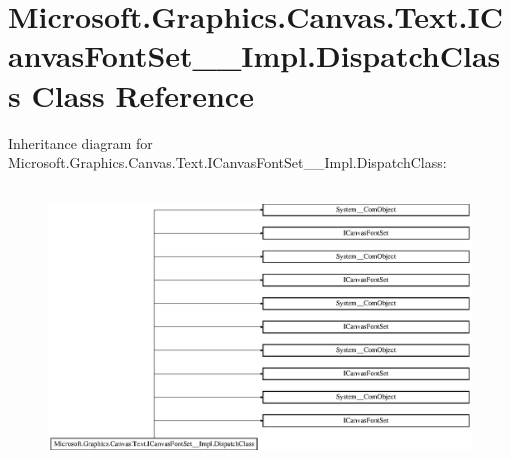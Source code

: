 \hypertarget{class_microsoft_1_1_graphics_1_1_canvas_1_1_text_1_1_i_canvas_font_set_____impl_1_1_dispatch_class}{}\section{Microsoft.\+Graphics.\+Canvas.\+Text.\+I\+Canvas\+Font\+Set\+\_\+\+\_\+\+Impl.\+Dispatch\+Class Class Reference}
\label{class_microsoft_1_1_graphics_1_1_canvas_1_1_text_1_1_i_canvas_font_set_____impl_1_1_dispatch_class}
Inheritance diagram for Microsoft.\+Graphics.\+Canvas.\+Text.\+I\+Canvas\+Font\+Set\+\_\+\+\_\+\+Impl.\+Dispatch\+Class\+:\begin{figure}[H]
\begin{center}
\leavevmode
\includegraphics[height=7.421687cm]{class_microsoft_1_1_graphics_1_1_canvas_1_1_text_1_1_i_canvas_font_set_____impl_1_1_dispatch_class}
\end{center}
\end{figure}
